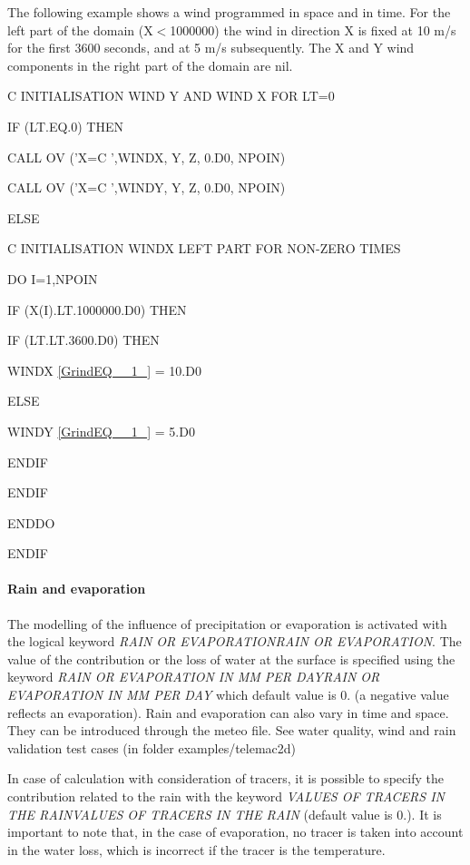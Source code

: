 \documentclass{article} %
\begin{document}
 The following example shows a wind programmed in space and in time. For the left part of the domain (X$<$1000000) the wind in direction X is fixed at 10 m/s for the first 3600 seconds, and at 5 m/s subsequently. The X and Y wind components in the right part of the domain are nil.



 C INITIALISATION WIND Y AND WIND X FOR LT=0

  IF (LT.EQ.0) THEN

    CALL OV ('X=C     ',WINDX, Y, Z, 0.D0, NPOIN)

    CALL OV ('X=C     ',WINDY, Y, Z, 0.D0, NPOIN)

  ELSE

 C INITIALISATION WINDX LEFT PART FOR NON-ZERO TIMES

    DO I=1,NPOIN

      IF (X(I).LT.1000000.D0) THEN

   IF (LT.LT.3600.D0) THEN

     WINDX \eqref{GrindEQ__1_} = 10.D0

   ELSE

     WINDY \eqref{GrindEQ__1_} = 5.D0

   ENDIF

       ENDIF

         ENDDO

   ENDIF


\paragraph{ Rain and evaporation}

 The modelling of the influence of precipitation or evaporation is activated with the logical keyword \textit{RAIN OR EVAPORATIONRAIN OR EVAPORATION}. The value of the contribution or the loss of water at the surface is specified using the keyword \textit{RAIN OR EVAPORATION IN MM PER DAYRAIN OR EVAPORATION IN MM PER DAY} which default value is 0. (a negative value reflects an evaporation). Rain and evaporation can also vary in time and space. They can be introduced through the meteo file. See water quality, wind and rain validation test cases (in folder examples/telemac2d)

 In case of calculation with consideration of tracers, it is possible to specify the contribution related to the rain with the keyword \textit{VALUES OF TRACERS IN THE RAINVALUES OF TRACERS IN THE RAIN} (default value is 0.). It is important to note that, in the case of evaporation, no tracer is taken into account in the water loss, which is incorrect if the tracer is the temperature.
\end{document}
